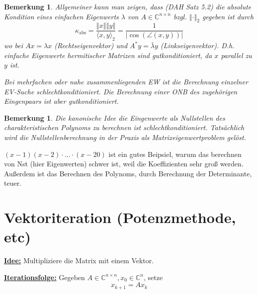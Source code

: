 \documentclass{book}
\newtheorem{remark}[algorithm]{Bemerkung}
\def\C{\mathbb{C}}
\begin{document}
            \begin{remark}\label{b4.10}
                Allgemeiner kann man zeigen, dass (DAH Satz 5.2) die absolute Kondition eines einfachen Eigenwerts 
                $\lambda$ von $A\in\C^{n\times n}$ bzgl. $\left\Vert \cdot \right\Vert_2$ gegeben ist durch 
                \[\kappa_{\text{abs}}=\frac{\left\Vert x \right\Vert\left\Vert y \right\Vert}{\langle x,y \rangle_2} = \frac{1}{\left\vert \cos(\angle(x,y)) \right\vert}\]
                wo bei $Ax=\lambda x$ (Rechtseigenvektor) und $A^* y = \bar{\lambda} y$ (Linkseigenvektor).
                D.h. einfache Eigenwerte hermitischer Matrizen sind gutkonditioniert, da $x$ parallel zu $y$ ist. 
                
                Bei mehrfachen oder nahe zusammenliegenden EW ist die Berechnung einzelner EV-Suche schlechtkonditioniert.
                Die Berechnung einer ONB des zugehörigen Eingenpaars ist aber gutkonditioniert.
            \end{remark}
           
            \begin{remark}\label{b4.11}
                Die kanonische Idee die Eingenwerte als Nullstellen des charakteristischen Polynoms zu berechnen ist schlechtkonditioniert. Tatsächlich wird die Nullstellenberechnung in der Praxis
                als Matrixeigenwertproblem gelöst.
            \end{remark}

            \begin{tcolorbox}[enhanced,breakable,
                title=Berechnung der EW]
                    $(x-1)(x-2)\cdot \dots \cdot (x-20)$ ist ein gutes Beipsiel, warum das berechnen von Nst (hier Eigenwerten) schwer ist, weil die Koeffizienten sehr groß werden.
                    Außerdem ist das Berechnen des Polynoms, durch Berechnung der Determinante, teuer.
            \end{tcolorbox}

        \section{Vektoriteration (Potenzmethode, etc)}

            \underline{\textbf{Idee:}} Multipliziere die Matrix mit einem Vektor.

            \underline{\textbf{Iterationsfolge:}} Gegeben $A\in\C^{n\times n},x_0\in\C^n$, setze \[x_{k+1}=Ax_k\]
\end{document}

